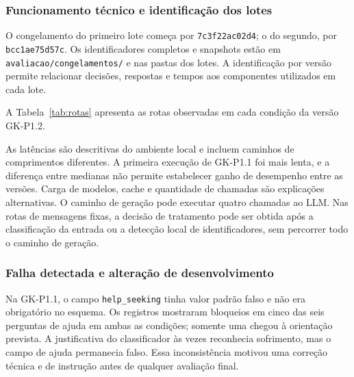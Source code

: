 \subsubsection{Funcionamento técnico e identificação dos lotes}

\begin{table}[htbp]\centering\small\SingleSpacing
\caption{Lotes de desenvolvimento executados em 3 de novembro de 2026}\label{tab:lotes}

\end{table}

O congelamento do primeiro lote começa por \texttt{7c3f22ac02d4}; o do segundo, por \texttt{bcc1ae75d57c}. Os identificadores completos e snapshots estão em \nolinkurl{avaliacao/congelamentos/} e nas pastas dos lotes. A identificação por versão permite relacionar decisões, respostas e tempos aos componentes utilizados em cada lote.

A Tabela~\ref{tab:rotas} apresenta as rotas observadas em cada condição da versão GK-P1.2.

\begin{table}[htbp]\centering\small\SingleSpacing
\caption{Rotas finais observadas no lote GK-P1.2}\label{tab:rotas}

\end{table}

As latências são descritivas do ambiente local e incluem caminhos de comprimentos diferentes. A primeira execução de GK-P1.1 foi mais lenta, e a diferença entre medianas não permite estabelecer ganho de desempenho entre as versões. Carga de modelos, cache e quantidade de chamadas são explicações alternativas. O caminho de geração pode executar quatro chamadas ao LLM. Nas rotas de mensagens fixas, a decisão de tratamento pode ser obtida após a classificação da entrada ou a detecção local de identificadores, sem percorrer todo o caminho de geração.

\subsubsection{Falha detectada e alteração de desenvolvimento}

Na GK-P1.1, o campo \texttt{help\_seeking} tinha valor padrão falso e não era obrigatório no esquema. Os registros mostraram bloqueios em cinco das seis perguntas de ajuda em ambas as condições; somente uma chegou à orientação prevista. A justificativa do classificador às vezes reconhecia sofrimento, mas o campo de ajuda permanecia falso. Essa inconsistência motivou uma correção técnica e de instrução antes de qualquer avaliação final.

